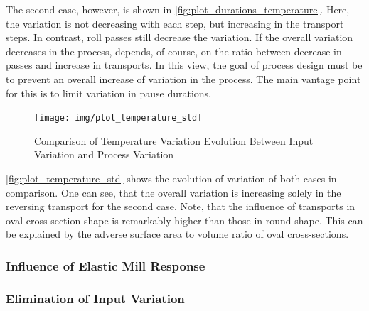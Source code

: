 The second case, however, is shown in \autoref{fig:plot_durations_temperature}.
Here, the variation is not decreasing with each step, but increasing in the transport steps.
In contrast, roll passes still decrease the variation.
If the overall variation decreases in the process, depends, of course, on the ratio between decrease in passes and increase in transports.
In this view, the goal of process design must be to prevent an overall increase of variation in the process.
The main vantage point for this is to limit variation in pause durations.

\begin{figure}
    \centering
    \texttt{[image: img/plot\_temperature\_std]}
    \caption{Comparison of Temperature Variation Evolution Between Input Variation and Process Variation}
    \label{fig:plot_temperature_std}
\end{figure}

\autoref{fig:plot_temperature_std} shows the evolution of variation of both cases in comparison.
One can see, that the overall variation is increasing solely in the reversing transport for the second case.
Note, that the influence of transports in oval cross-section shape is remarkably higher than those in round shape.
This can be explained by the adverse surface area to volume ratio of oval cross-sections.



\subsubsection{Influence of Elastic Mill Response}\label{subsubsec:influence-of-elastic-mill-response}

\subsubsection{Elimination of Input Variation}\label{subsubsec:elimination-of-input-variation}

